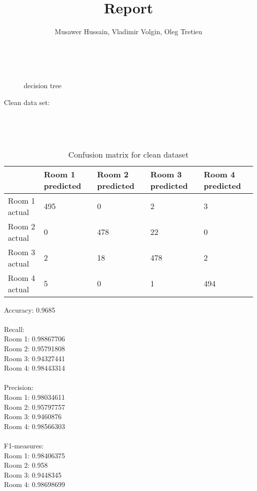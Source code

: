 \documentclass{article}
\begin{document}
\title{Report}

\author{Musawer Hussain, Vladimir Volgin, Oleg Tretieu}

\maketitle

\

\begin{figure}[h]
  \caption{decision tree}
\end{figure}
\pagebreak 

\begin{center}
Clean data set:
\end{center}
  \\

\begin{table}[htb]
  \caption{Confusion matrix for clean dataset} \\
  \begin{tabular}{|l|l|l|l|l|}
  \hline
                & Room 1 predicted & Room 2 predicted & Room 3 predicted & Room 4 predicted \\ \hline
  Room 1 actual & 495              & 0                & 2                & 3                \\ \hline
  Room 2 actual & 0                & 478              & 22               & 0                \\ \hline
  Room 3 actual & 2                & 18               & 478              & 2                \\ \hline
  Room 4 actual & 5                & 0                & 1                & 494              \\ \hline
  \end{tabular}
\end{table}


Accuracy: 0.9685 \\
\\
Recall: \\
Room 1: 0.98867706 \\
Room 2: 0.95791808 \\
Room 3: 0.94327441 \\
Room 4: 0.98443314 \\
\\
Precision: \\
Room 1: 0.98034611 \\
Room 2: 0.95797757 \\
Room 3: 0.9460876 \\
Room 4: 0.98566303 \\
\\
F1-measures: \\
Room 1: 0.98406375 \\
Room 2: 0.958  \\
Room 3: 0.9448345 \\
Room 4: 0.98698699 \\
\pagebreak 
\end{document}
